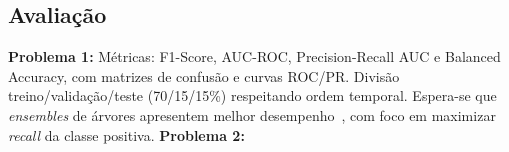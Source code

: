 \documentclass[10pt,twocolumn,letterpaper]{article}
\begin{document}
\subsection{Avaliação}
\textbf{Problema 1:}
Métricas: F1-Score, AUC-ROC, Precision-Recall AUC e Balanced
Accuracy, com matrizes de confusão e curvas ROC/PR. Divisão
treino/validação/teste (70/15/15\%) respeitando ordem temporal.
Espera-se que \emph{ensembles} de árvores apresentem melhor
desempenho~\cite{grinsztajn2022tree}, com foco em maximizar
\emph{recall} da classe positiva.
\textbf{Problema 2:}

\newpage
{\small


}
\end{document}
